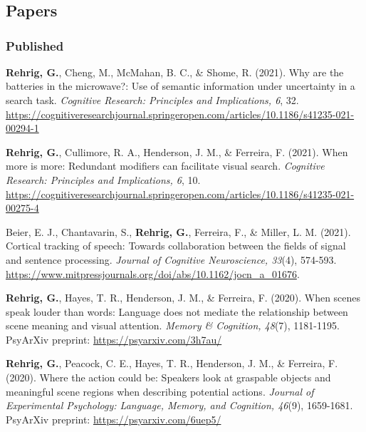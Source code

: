 \section*{}
\label{sec:pubs}

\subsection*{Papers}

\subsubsection*{Published}

\textbf{Rehrig, G.}, Cheng, M., McMahan, B. C., \& Shome, R. (2021). Why are the batteries in the microwave?: Use of semantic information under uncertainty in a search task. \textit{Cognitive Research: Principles and Implications, 6}, 32. \url{https://cognitiveresearchjournal.springeropen.com/articles/10.1186/s41235-021-00294-1}

\textbf{Rehrig, G.}, Cullimore, R. A., Henderson, J. M., \& Ferreira, F. (2021). When more is more: Redundant modifiers can facilitate visual search. \textit{Cognitive Research: Principles and Implications, 6}, 10. \url{https://cognitiveresearchjournal.springeropen.com/articles/10.1186/s41235-021-00275-4}

Beier, E. J., Chantavarin, S., \textbf{Rehrig, G.}, Ferreira, F., \& Miller, L. M. (2021). Cortical tracking of speech: Towards collaboration between the fields of signal and sentence processing. \textit{Journal of Cognitive Neuroscience, 33}(4), 574-593. \url{https://www.mitpressjournals.org/doi/abs/10.1162/jocn_a_01676}.

\textbf{Rehrig, G.}, Hayes, T. R., Henderson, J. M., \& Ferreira, F. (2020). When scenes speak louder than words: Language does not mediate the relationship between scene meaning and visual attention. \textit{Memory \& Cognition, 48}(7), 1181-1195. PsyArXiv preprint: \url{https://psyarxiv.com/3h7au/}

\textbf{Rehrig, G.}, Peacock, C. E., Hayes, T. R., Henderson, J. M., \& Ferreira, F. (2020). Where the action could be: Speakers look at graspable objects and meaningful scene regions when describing potential actions. \textit{Journal of Experimental Psychology: Language, Memory, and Cognition, 46}(9), 1659-1681. PsyArXiv preprint: \url{https://psyarxiv.com/6uep5/}


